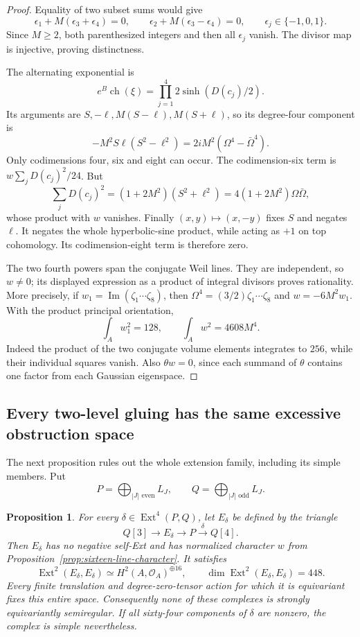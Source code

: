\documentclass[11pt]{article}
\newtheorem{proposition}[theorem]{Proposition}
\theoremstyle{definition}
\theoremstyle{remark}
\begin{document}
\begin{proof}
Equality of two subset sums would give
\[
 \epsilon_1+M(\epsilon_3+\epsilon_4)=0,
 \qquad \epsilon_2+M(\epsilon_3-\epsilon_4)=0,
 \qquad \epsilon_j\in\{-1,0,1\}.
\]
Since $M\ge2$, both parenthesized integers and then all $\epsilon_j$ vanish. The divisor map is injective, proving distinctness.

The alternating exponential is
\[
 e^B\operatorname{ch}(\xi)
 =\prod_{j=1}^4 2\sinh(D(c_j)/2).
\]
Its arguments are $S,-\ell,M(S-\ell),M(S+\ell)$, so its degree-four component is
\[
 -M^2S\ell(S^2-\ell^2)=2iM^2(\Omega^4-\bar\Omega^4).
\]
Only codimensions four, six and eight can occur. The codimension-six term is $w\sum_jD(c_j)^2/24$. But
\[
 \sum_jD(c_j)^2=(1+2M^2)(S^2+\ell^2)
   =4(1+2M^2)\Omega\bar\Omega,
\]
whose product with $w$ vanishes. Finally $(x,y)\mapsto(x,-y)$ fixes $S$ and negates $\ell$. It negates the whole hyperbolic-sine product, while acting as $+1$ on top cohomology. Its codimension-eight term is therefore zero.

The two fourth powers span the conjugate Weil lines. They are independent, so $w\ne0$; its displayed expression as a product of integral divisors proves rationality. More precisely, if $w_1=\operatorname{Im}(\zeta_1\cdots\zeta_8)$, then $\Omega^4=(3/2)\zeta_1\cdots\zeta_8$ and $w=-6M^2w_1$. With the product principal orientation,
\[
 \int_A w_1^2=128,\qquad \int_Aw^2=4608M^4.
\]
Indeed the product of the two conjugate volume elements integrates to $256$, while their individual squares vanish. Also $\theta w=0$, since each summand of $\theta$ contains one factor from each Gaussian eigenspace.
\end{proof}

\subsection{Every two-level gluing has the same excessive obstruction space}

The next proposition rules out the whole extension family, including its simple members. Put
\[
 P=\bigoplus_{|J|\text{ even}}L_J,
 \qquad Q=\bigoplus_{|J|\text{ odd}}L_J.
\]

\begin{proposition}\label{prop:sixteen-line-gluing}
For every $\delta\in\operatorname{Ext}^4(P,Q)$, let $E_\delta$ be defined by the triangle
\[
 Q[3]\longrightarrow E_\delta\longrightarrow P
       \xrightarrow{\delta}Q[4].
\]
Then $E_\delta$ has no negative self-Ext and has normalized character $w$ from Proposition~\ref{prop:sixteen-line-character}. It satisfies
\[
 \operatorname{Ext}^2(E_\delta,E_\delta)
       \simeq H^2(A,\mathcal O_A)^{\oplus16},
 \qquad\dim\operatorname{Ext}^2(E_\delta,E_\delta)=448.
\]
Every finite translation and degree-zero-tensor action for which it is equivariant fixes this entire space. Consequently none of these complexes is strongly equivariantly semiregular. If all sixty-four components of $\delta$ are nonzero, the complex is simple nevertheless.
\end{proposition}
\end{document}
